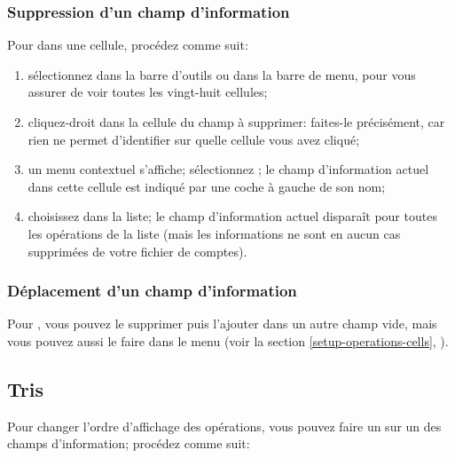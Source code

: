 \subsubsection{Suppression d'un champ d'information\label{transactions-list-fields-remove}}

Pour  dans une cellule, procédez comme suit:

\begin{enumerate}
	\item sélectionnez  dans la barre d'outils ou  dans la barre de menu, pour vous assurer de voir toutes les vingt-huit cellules;
	\item cliquez-droit dans la cellule du champ à supprimer: faites-le précisément, car rien ne permet d'identifier sur quelle cellule vous avez cliqué;
	\item un menu contextuel s'affiche; sélectionnez ; le champ d'information actuel dans cette cellule est indiqué par une coche à gauche de son nom;
	\item choisissez  dans la liste; le champ d'information actuel disparaît pour toutes les opérations de la liste (mais les informations ne sont en aucun cas supprimées de votre fichier de comptes).
\end{enumerate}


\subsubsection{Déplacement d'un champ d'information\label{transactions-list-fields-move}}

Pour , vous pouvez le supprimer puis l'ajouter dans un autre champ vide, mais vous pouvez aussi le faire dans le menu  (voir la section \vref{setup-operations-cells}, ).


\subsection{Tris\label{transactions-list-sorts}}

Pour changer l'ordre d'affichage des opérations, vous pouvez faire un  sur un des champs d'information; procédez comme suit:

